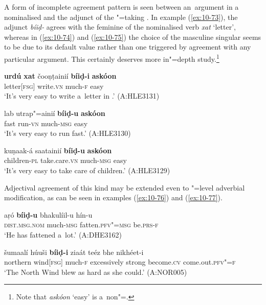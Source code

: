 A form of incomplete agreement pattern is seen between an~argument in a nominalised  and the adjunct of the "=taking . In example (\ref{ex:10-73}), the adjunct \textit{bíiḍ-} agrees with the feminine  of the nominalised verb \textit{xat} `letter', whereas in (\ref{ex:10-74}) and (\ref{ex:10-75}) the choice of the masculine singular seems to be due to its default value rather than one triggered by agreement with any particular argument. This certainly deserves more in"=depth study.\footnote{Note that \textit{askóon} `easy' is a~non"=.}

\begin{exe}
\ex
\label{ex:10-73}
\gll {\ob}\textbf{urdú} \textbf{xat}{\cb} čooṇṭainií {\ob}\textbf{bíiḍ-i} \textbf{askóon}{\cb} \\
\iliUrdu letter[\textsc{fsg}] write.\textsc{vn} much-\textsc{f} easy  \\
\glt `It's very easy to write a~letter in \iliUrdu.' (A:HLE3131)

\ex
\label{ex:10-74}
\gll lab utrap"=ainií {\ob}\textbf{bíiḍ-u} \textbf{askóon}{\cb} \\
fast run-\textsc{vn} much-\textsc{msg} easy \\
\glt `It's very easy to run fast.' (A:HLE3130)

\ex
\label{ex:10-75}
\gll kuṇaak-á saatainií {\ob}\textbf{bíiḍ-u} \textbf{askóon}{\cb} \\
children-\textsc{pl} take.care.\textsc{vn} much-\textsc{msg} easy \\
\glt `It's very easy to take care of children.' (A:HLE3129)
\end{exe}

Adjectival agreement of this kind may be extended even to "=level adverbial modification, as can be seen in examples (\ref{ex:10-76}) and (\ref{ex:10-77}).

\begin{exe}
\ex
\label{ex:10-76}
\gll aṛó \textbf{bíiḍ-u} bhakulíil-u hín-u\\
 \textsc{dist.msg.nom} much-\textsc{msg} fatten.\textsc{pfv"=msg} be.\textsc{prs-f} \\
\glt `He has fattened a~lot.' (A:DHE3162)

\ex
\label{ex:10-77}
\gll šumaalí húuši \textbf{bíiḍ-i} ziaát teéz bhe nikhéet-i\\
northern wind[\textsc{fsg}] much-\textsc{f} excessively strong become.\textsc{cv} come.out.\textsc{pfv"=f}\\
\glt `The North Wind blew as hard as she could.' (A:NOR005)
\end{exe}